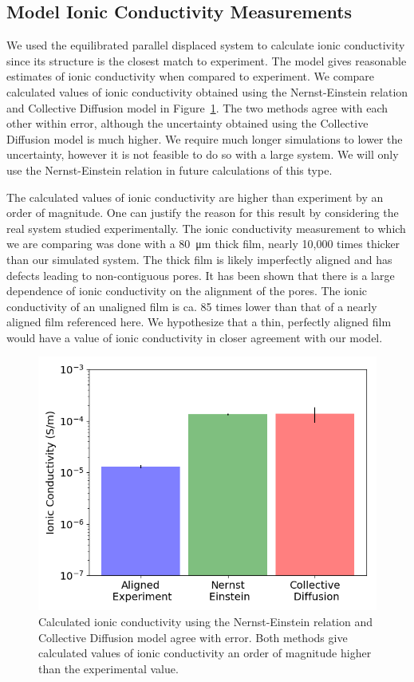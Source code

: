 \documentclass{article}
\begin{document}
  \subsection{Model Ionic Conductivity Measurements}

  We used the equilibrated parallel displaced system to calculate ionic
  conductivity since its structure is the closest match to experiment. The model
  gives reasonable estimates of ionic conductivity when compared to experiment.
  We compare calculated values of ionic conductivity obtained using the
  Nernst-Einstein relation and Collective Diffusion model in
  Figure~\ref{fig:conductivity}. The two methods agree with each other within
  error, although the uncertainty obtained using the Collective Diffusion model
  is much higher. We require much longer simulations to lower the uncertainty,
  however it is not feasible to do so with a large system. We will only use the
  Nernst-Einstein relation in future calculations of this type. 

  The calculated values of ionic conductivity are higher than experiment by an
  order of magnitude. One can justify the reason for this result by considering
  the real system studied experimentally. The ionic conductivity measurement to
  which we are comparing was done with a \SI{80}{\micro\metre} thick film, nearly
  10,000 times thicker than our simulated system. The thick film is likely
  imperfectly aligned and has defects leading to non-contiguous pores. It has
  been shown that there is a large dependence of ionic conductivity on the
  alignment of the pores. The ionic conductivity of an unaligned film is ca. 85
  times lower than that of a nearly aligned film referenced here. We hypothesize
  that a thin, perfectly aligned film would have a value of ionic conductivity in
  closer agreement with our model.
 
  \begin{figure}
        \centering
        \includegraphics[width=0.5\linewidth]{IC_offset.png}
        \caption{Calculated ionic conductivity using the Nernst-Einstein relation
        and Collective Diffusion model agree with error. Both methods give calculated
        values of ionic conductivity an order of magnitude higher than the experimental
        value.}
        \label{fig:conductivity}
  \end{figure}
\end{document}
